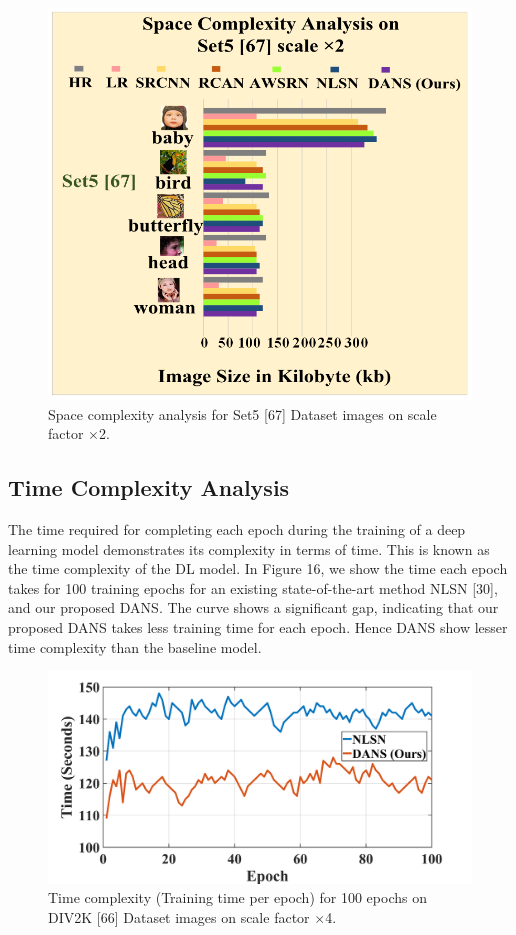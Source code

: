 \documentclass{ieeeaccess}
\begin{document}
\begin{figure}
  \includegraphics[width=\linewidth]{15FIGURE.png}
  \caption{Space complexity analysis for Set5 [67] Dataset images on scale factor $\times$2.}
  \label{fig:15}
\end{figure}

\subsection{Time Complexity Analysis}

The time required for completing each epoch during the training of a deep learning model demonstrates its complexity in terms of time. This is known as the time complexity of the DL model. In Figure 16, we show the time each epoch takes for 100 training epochs for an existing state-of-the-art method NLSN [30], and our proposed DANS. The curve shows a significant gap, indicating that our proposed DANS takes less training time for each epoch. Hence DANS show lesser time complexity than the baseline model.

\begin{figure}
  \includegraphics[width=\linewidth]{16FIGURE.png}
  \caption{Time complexity (Training time per epoch) for 100 epochs on DIV2K [66] Dataset images on scale factor $\times$4.}
  \label{fig:16}
\end{figure}
\end{document}
